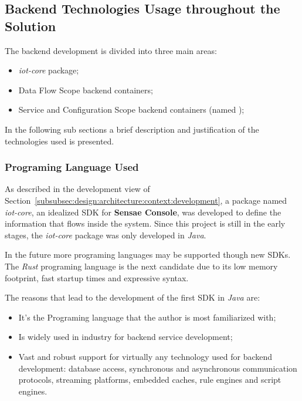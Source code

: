 \subsection{Backend Technologies Usage throughout the Solution}
\label{subsec:implementation:decisions:backend}

The backend development is divided into three main areas:

\begin{itemize}
    \item \textit{iot-core} package;
    \item Data Flow Scope backend containers;
    \item Service and Configuration Scope backend containers (named );
\end{itemize}

In the following sub sections a brief description and justification of the technologies used is presented.

\subsubsection*{Programing Language Used}
\label{subsubsec:implementation:decisions:backend:prog}

As described in the development view of Section~\ref{subsubsec:design:architecture:context:development}, a package named \textit{iot-core}, an idealized \gls{SDK} for \textbf{Sensae Console}, was developed to define the information that flows inside the system. 
Since this project is still in the early stages, the \textit{iot-core} package was only developed in \textit{Java}.

In the future more programing languages may be supported though new \gls{SDK}s. The \textit{Rust} programing language is the next candidate due to its low memory footprint, fast startup times and expressive syntax.

The reasons that lead to the development of the first \gls{SDK} in \textit{Java} are:

\begin{itemize}
    \item It's the Programing language that the author is most familiarized with;
    \item Is widely used in industry for backend service development;
    \item Vast and robust support for virtually any technology used for backend development: database access, synchronous and asynchronous communication protocols, streaming platforms, embedded caches, rule engines and script engines.
\end{itemize}


